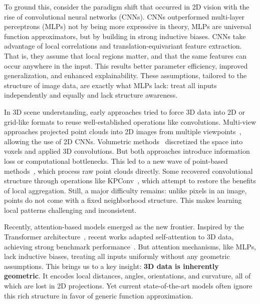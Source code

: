 To ground this, consider the paradigm shift that occurred in 2D vision with the
rise of convolutional neural networks (CNNs). CNNs outperformed multi-layer
perceptrons (MLPs) not by being more expressive in theory, MLPs are universal
function approximators, but by building in strong inductive biases.
%
CNNs take advantage of local correlations and translation-equivariant feature
extraction. That is, they assume that local regions matter, and that the same
features can occur anywhere in the input. This results better parameter
efficiency, improved generalization, and enhanced explainability.
%
These assumptions, tailored to the structure of image data, are exactly what
MLPs lack: treat all inputs independently and equally and lack structure
awareness.
%

In 3D scene understanding, early approaches tried to force 3D data into 2D or
grid-like formats to reuse well-established operations like convolutions.
%
Multi-view approaches projected point clouds into 2D images from multiple
viewpoints~\cite{su2015multi,lawin2017deep,feng2018gvcnn}, allowing the use of
2D CNNs.
%
Volumetric
methods~\cite{maturana2015voxnet,zhang2020polarnet,chen2023voxelnext}
discretized the space into voxels and applied 3D convolutions. But both
approaches introduce information loss or computational bottlenecks.
%
This led to a new wave of point-based
methods~\cite{qi2017pointnet,qi2017pointnet++,li2018pointcnn,thomas2019kpconv,hu2020randla,kong2023rethinking,qian2022pointnext},
which process raw point clouds directly. Some recovered convolutional structure
through operations like KPConv~\cite{thomas2019kpconv}, which attempt to
restore the benefits of local aggregation.
%
Still, a major difficulty remains: unlike pixels in an image, points do not
come with a fixed neighborhood structure. This makes learning local patterns
challenging and inconsistent.

Recently, attention-based models emerged as the new frontier. Inspired by the
Transformer architecture~\cite{vaswani2017attention}, recent works adapted
self-attention to 3D data, achieving strong benchmark
performance~\cite{zhao2021point,wu2022point,lai2022stratified,park2022fast,wang2023octformer,lai2023spherical,wu2023ptv3}.
But attention mechanisms, like MLPs, lack inductive biases, treating all inputs
uniformly without any geometric assumptions.
%
This brings us to a key insight: \textbf{3D data is inherently geometric}. It
encodes local distances, angles, orientations, and curvature, all of which are
lost in 2D projections. Yet current state-of-the-art models often ignore this
rich structure in favor of generic function approximation.

